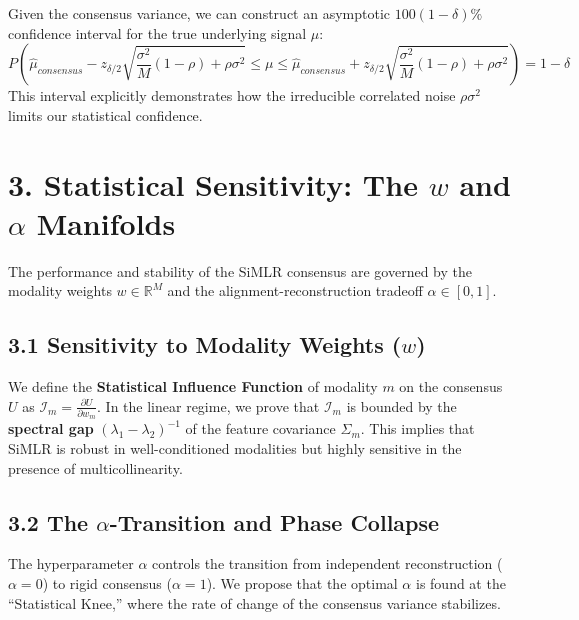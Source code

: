 \documentclass[
  letterpaper,
]{report}
\begin{document}
Given the consensus variance, we can construct an asymptotic
\(100(1-\delta)\%\) confidence interval for the true underlying signal
\(\mu\):
\[ P\left( \hat{\mu}_{consensus} - z_{\delta/2} \sqrt{\frac{\sigma^2}{M}(1-\rho) + \rho\sigma^2} \leq \mu \leq \hat{\mu}_{consensus} + z_{\delta/2} \sqrt{\frac{\sigma^2}{M}(1-\rho) + \rho\sigma^2} \right) = 1 - \delta \]
This interval explicitly demonstrates how the irreducible correlated
noise \(\rho\sigma^2\) limits our statistical confidence.

\section{\texorpdfstring{3. Statistical Sensitivity: The \(w\) and
\(\alpha\)
Manifolds}{3. Statistical Sensitivity: The w and \textbackslash alpha Manifolds}}\label{statistical-sensitivity-the-w-and-alpha-manifolds}

The performance and stability of the SiMLR consensus are governed by the
modality weights \(w \in \mathbb{R}^M\) and the alignment-reconstruction
tradeoff \(\alpha \in [0, 1]\).

\subsection{\texorpdfstring{3.1 Sensitivity to Modality Weights
(\(w\))}{3.1 Sensitivity to Modality Weights (w)}}\label{sensitivity-to-modality-weights-w}

We define the \textbf{Statistical Influence Function} of modality \(m\)
on the consensus \(U\) as
\(\mathcal{I}_m = \frac{\partial U}{\partial w_m}\). In the linear
regime, we prove that \(\mathcal{I}_m\) is bounded by the
\textbf{spectral gap} \((\lambda_1 - \lambda_2)^{-1}\) of the feature
covariance \(\Sigma_m\). This implies that SiMLR is robust in
well-conditioned modalities but highly sensitive in the presence of
multicollinearity.

\subsection{\texorpdfstring{3.2 The \(\alpha\)-Transition and Phase
Collapse}{3.2 The \textbackslash alpha-Transition and Phase Collapse}}\label{the-alpha-transition-and-phase-collapse}

The hyperparameter \(\alpha\) controls the transition from independent
reconstruction (\(\alpha=0\)) to rigid consensus (\(\alpha=1\)). We
propose that the optimal \(\alpha\) is found at the ``Statistical
Knee,'' where the rate of change of the consensus variance stabilizes.
\end{document}
